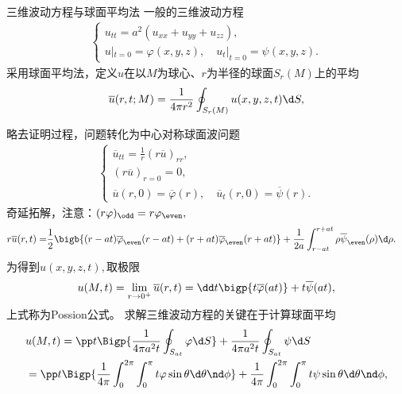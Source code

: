 \begin{example}{三维波动方程与球面平均法}{}
	一般的三维波动方程
	\begin{align*}
		\begin{cases}
			u_{tt}=a^2(u_{xx}+u_{yy}+u_{zz}),                     \\
			u|_{t=0}=\varphi(x,y,z),\quad u_t|_{t=0}=\psi(x,y,z).
		\end{cases}
	\end{align*}
	采用球面平均法，定义$u$在以$M$为球心、$r$为半径的球面$S_r(M)$上的平均
	\[
		\overline u(r,t;M)=\frac1{4\pi r^2}\oint_{S_r(M)}u(x,y,z,t)\d S,
	\]
	
	略去证明过程，问题转化为中心对称球面波问题
	\begin{align*}
		\begin{cases}
			\overline u_{tt}=\frac1r(r\overline u)_{rr},                                \\
			(r\overline u)_{r=0}=0,                                                        \\
			\overline u(r,0)=\overline\varphi(r),\quad\overline u_t(r,0)=\overline\psi(r).
		\end{cases}
	\end{align*}
	奇延拓解，注意：$(r\varphi)_\odd=r\varphi_\even,$
	\begin{align*}
		r\overline u(r,t)= & \frac12\bigb{(r-at)\overline\varphi_\even(r-at)+(r+at)\overline\varphi_\even(r+at)}+\frac1{2a}\int_{r-at}^{r+at}\rho\overline\psi_\even(\rho)\d\rho.
	\end{align*}
	为得到$u(x,y,z,t),$取极限
	\begin{align*}
		u(M,t)=\lim_{r\to 0^+}\overline u(r,t)
		=\dd t\bigp{t\overline\varphi(at)}+t\overline\psi(at),
	\end{align*}
	上式称为Possion公式。
	\tcblower
	求解三维波动方程的关键在于计算球面平均
	\begin{align}
		\label{3D-Wave}
		&u(M,t)  =\pp t\Bigp{\frac1{4\pi a^2t}\oint_{S_{at}}\varphi\d S}+\frac1{4\pi a^2t}\oint_{S_{at}}\psi\d S\\\notag
		& =\pp t\Bigp{\frac1{4\pi}\int_0^{2\pi}\int_0^\pi t\varphi\sin\theta\d\theta\nd\phi}+\frac1{4\pi}\int_0^{2\pi}\int_0^\pi t\psi\sin\theta\d\theta\nd\phi,
	\end{align}
\end{example}

